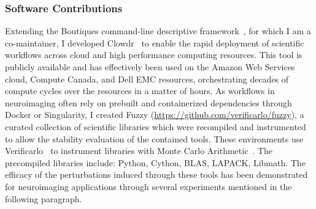 \subsubsection*{Software Contributions}
Extending the Boutiques command-line descriptive framework~\cite{Glatard2018-tu}, for which I am a co-maintainer, I
developed Clowdr~\cite{Kiar2019-sr} to enable the rapid deployment of scientific workflows across cloud and high
performance computing resources. This tool is publicly available and has effectively been used on the Amazon Web
Services cloud, Compute Canada, and Dell EMC resources, orchestrating decades of compute cycles over the resources in a
matter of hours. As workflows in neuroimaging often rely on prebuilt and containerized dependencies through Docker or
Singularity, I created Fuzzy (\href{https://github.com/verificarlo/fuzzy}{https://github.com/verificarlo/fuzzy}),
a curated collection of scientific libraries which were recompiled and instrumented to allow the stability evaluation
of the contained tools. These environments use Verificarlo~\cite{Denis2016-wo} to instrument libraries with Monte Carlo
Arithmetic~\cite{Parker1997-qq}. The precompiled libraries include: Python, Cython, BLAS, LAPACK, Libmath. The efficacy
of the perturbations induced through these tools has been demonstrated for neuroimaging applications through several
experiments mentioned in the following paragraph.

